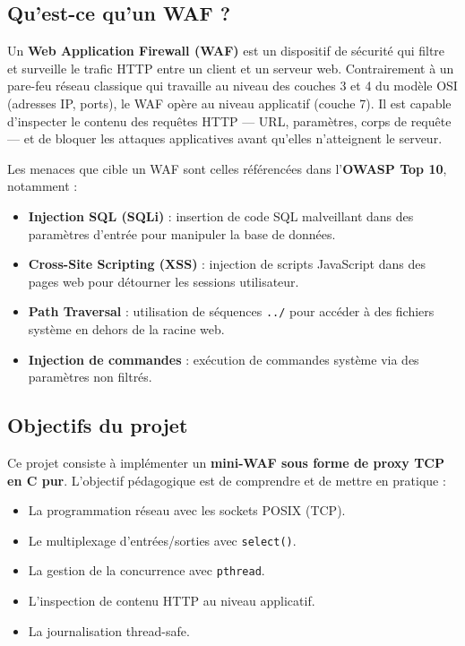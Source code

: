 \documentclass[12pt,a4paper]{article}
\begin{document}
\subsection{Qu'est-ce qu'un WAF ?}

Un \textbf{Web Application Firewall (WAF)} est un dispositif de sécurité qui filtre et surveille le trafic HTTP entre un client et un serveur web. Contrairement à un pare-feu réseau classique qui travaille au niveau des couches 3 et 4 du modèle OSI (adresses IP, ports), le WAF opère au niveau applicatif (couche 7). Il est capable d'inspecter le contenu des requêtes HTTP --- URL, paramètres, corps de requête --- et de bloquer les attaques applicatives avant qu'elles n'atteignent le serveur.

Les menaces que cible un WAF sont celles référencées dans l'\textbf{OWASP Top 10}, notamment :

\begin{itemize}
  \item \textbf{Injection SQL (SQLi)} : insertion de code SQL malveillant dans des paramètres d'entrée pour manipuler la base de données.
  \item \textbf{Cross-Site Scripting (XSS)} : injection de scripts JavaScript dans des pages web pour détourner les sessions utilisateur.
  \item \textbf{Path Traversal} : utilisation de séquences \texttt{../} pour accéder à des fichiers système en dehors de la racine web.
  \item \textbf{Injection de commandes} : exécution de commandes système via des paramètres non filtrés.
\end{itemize}

\subsection{Objectifs du projet}

Ce projet consiste à implémenter un \textbf{mini-WAF sous forme de proxy TCP en C pur}. L'objectif pédagogique est de comprendre et de mettre en pratique :

\begin{itemize}
  \item La programmation réseau avec les sockets POSIX (TCP).
  \item Le multiplexage d'entrées/sorties avec \texttt{select()}.
  \item La gestion de la concurrence avec \texttt{pthread}.
  \item L'inspection de contenu HTTP au niveau applicatif.
  \item La journalisation thread-safe.
\end{itemize}
\end{document}
